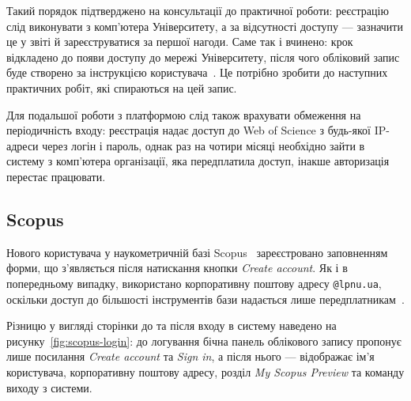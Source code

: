 \documentclass[14pt,a4paper]{extreport}
\begin{document}
Такий порядок підтверджено на консультації до практичної роботи: реєстрацію слід виконувати з комп'ютера Університету, а за відсутності доступу — зазначити це у звіті й зареєструватися за першої нагоди. Саме так і вчинено: крок відкладено до появи доступу до мережі Університету, після чого обліковий запис буде створено за інструкцією користувача~\cite{wos-manual}. Це потрібно зробити до наступних практичних робіт, які спираються на цей запис.

Для подальшої роботи з платформою слід також врахувати обмеження на періодичність входу: реєстрація надає доступ до Web of Science з будь-якої IP-адреси через логін і пароль, однак раз на чотири місяці необхідно зайти в систему з комп'ютера організації, яка передплатила доступ, інакше авторизація перестає працювати.

\subsection{Scopus}

Нового користувача у наукометричній базі Scopus~\cite{scopus-db} зареєстровано заповненням форми, що з'являється після натискання кнопки \textit{Create account}. Як і в попередньому випадку, використано корпоративну поштову адресу \texttt{@lpnu.ua}, оскільки доступ до більшості інструментів бази надається лише передплатникам~\cite{scopus-guide}.

Різницю у вигляді сторінки до та після входу в систему наведено на рисунку~\ref{fig:scopus-login}: до логування бічна панель облікового запису пропонує лише посилання \textit{Create account} та \textit{Sign in}, а після нього — відображає ім'я користувача, корпоративну поштову адресу, розділ \textit{My Scopus Preview} та команду виходу з системи.
\end{document}
